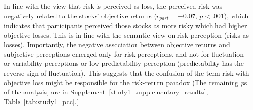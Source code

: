 \documentclass[a4paper,man, natbib,floatsintext]{apa6} %
\begin{document}

 


In line with the view that risk is perceived as loss, the perceived risk was negatively related to the stocks' objective returns ($r_{part} = -0.07$, $p < .001$), which indicates that participants perceived those stocks as more risky which had higher objective losses. This is in line with the semantic view on risk perception (risks as losses). Importantly, the negative association between objective returns and subjective perceptions emerged only for risk perceptions, and not for fluctuation or variability perceptions or low predictability perception (predictability has the reverse sign of fluctuation). This suggests that the confusion of the term risk with objective loss might be responsible for the risk-return paradox (The remaining \textit{p}s of the analysis, are in Supplement~\ref{study1_supplementary_results}, Table~\ref{tab:study1_pcc}.)
\end{document}
